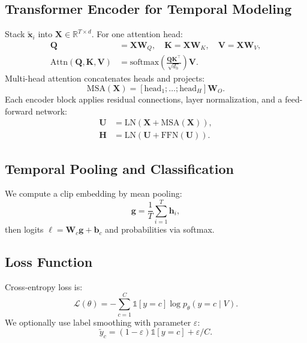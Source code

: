 \documentclass[conference]{IEEEtran}
\begin{document}
\subsection{Transformer Encoder for Temporal Modeling}
Stack $\tilde{\mathbf{x}}_i$ into $\mathbf{X}\in\mathbb{R}^{T\times d}$. For one attention head:
\begin{align}
\mathbf{Q} &= \mathbf{X}\mathbf{W}_Q,\quad 
\mathbf{K} = \mathbf{X}\mathbf{W}_K,\quad 
\mathbf{V} = \mathbf{X}\mathbf{W}_V, \\
\text{Attn}(\mathbf{Q},\mathbf{K},\mathbf{V}) &= \text{softmax}\!\left(\frac{\mathbf{Q}\mathbf{K}^\top}{\sqrt{d_h}}\right)\mathbf{V}.
\end{align}
Multi-head attention concatenates heads and projects:
\begin{equation}
\text{MSA}(\mathbf{X}) = \left[\text{head}_1;\dots;\text{head}_H\right]\mathbf{W}_O.
\end{equation}
Each encoder block applies residual connections, layer normalization, and a feed-forward network:
\begin{align}
\mathbf{U} &= \text{LN}(\mathbf{X} + \text{MSA}(\mathbf{X})),\\
\mathbf{H} &= \text{LN}(\mathbf{U} + \text{FFN}(\mathbf{U})).
\end{align}

\subsection{Temporal Pooling and Classification}
We compute a clip embedding by mean pooling:
\begin{equation}
\mathbf{g} = \frac{1}{T}\sum_{i=1}^{T} \mathbf{h}_i,
\end{equation}
then logits $\boldsymbol{\ell} = \mathbf{W}_c\mathbf{g} + \mathbf{b}_c$ and probabilities via softmax.

\subsection{Loss Function}
Cross-entropy loss is:
\begin{equation}
\mathcal{L}(\theta) = -\sum_{c=1}^{C} \mathbb{1}[y=c]\log p_\theta(y=c \mid V).
\end{equation}
We optionally use label smoothing with parameter $\varepsilon$:
\begin{equation}
\tilde{y}_c = (1-\varepsilon)\mathbb{1}[y=c] + \varepsilon/C.
\end{equation}
\end{document}
